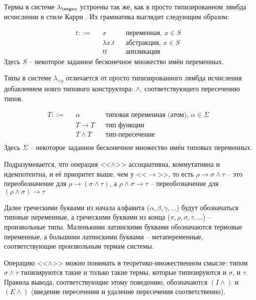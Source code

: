 \documentclass[../main.tex]{subfiles}
\begin{document}
\label{sec:the_system}

Термы в системе $\lambda_{\wege \eta}$ устроены так же, как в просто типизированном лямбда исчислении в стиле Карри \cite{curry_1969}. Их грамматика выглядит следующим образом:
\begin{definition}
\begin{align*}
t ::= & \text{ } x              && \text{переменная, $x \in S$}\\
      & \text{ } \lambda x . t  && \text{абстракция, $x \in S$}\\
      & \text{ } t t            && \text{аппликация}
\end{align*}
Здесь $S$ -- некоторое заданное бесконечное множество имён переменных.
\end{definition}


Типы в системе $\lambda_{\wedge \eta}$ отличается от просто типизированного лямбда исчисления добавлением новго типового конструктора: $\wedge$, соответствующего пересечению типов.

\begin{definition}
\begin{align*}
T ::= & \text{ } \alpha          && \text{типовая переменная (атом), $\alpha \in \Sigma$}\\
      & \text{ } T \to T         && \text{тип функции}\\
      & \text{ } T \wedge T      && \text{тип-пересечение}\\
\end{align*}
Здесь $\Sigma$ -- некоторое заданное бесконечное множество имён типовых переменных.
\end{definition}

Подразумевается, что операция <<$\wedge$>> ассоциативна, коммутативна и идемпотентна, и её приоритет выше, чем у <<$\to$>>, то есть $\rho \to \sigma \wedge \tau$ -- это переобозначение для $\rho \to (\sigma \wedge \tau)$, а $\rho \wedge \sigma \to \tau$ -- переобозначение для $(\rho \wedge \sigma) \to \tau$

Далее греческими буквами из начала алфавита ($\alpha, \beta, \gamma, \dots$) будут обозначаться типовые переменные, а греческими буквами из конца ($\pi, \rho, \sigma, \tau, \dots$) -- произвольные типы. Маленькими латинскими буквами обозначаются термовые переменные, а большими латинскими буквами -- метапеременные, соответствующие произвольным термам системы.


Операцию <<$\wedge$>> можно понимать в теоретико-множественном смысле: типом $\sigma \wedge \tau$ типизируются такие и только такие термы, которые типизируются и $\sigma$, и $\tau$. Правила вывода, соответствующие этому поведению, обозначаются $(I\wedge)$ и $(E\wedge)$ (введение пересечения и удаление пересечения соответственно). 
\end{document}
